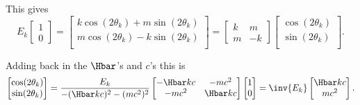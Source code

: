 {This gives
%
\begin{dmath}\label{eqn:qmLecture9Problems:320}
E_k
\begin{bmatrix}
1 \\
0
\end{bmatrix}
=
\begin{bmatrix}
k \cos(2 \theta_k) + m \sin(2 \theta_k) \\
m \cos(2 \theta_k) - k \sin(2 \theta_k) \\
\end{bmatrix}
=
\begin{bmatrix}
k & m \\
m & -k
\end{bmatrix}
\begin{bmatrix}
\cos(2 \theta_k) \\
\sin(2 \theta_k) \\
\end{bmatrix}.
\end{dmath}

Adding back in the \(\Hbar\)'s and \(c\)'s this is
%
\begin{dmath}\label{eqn:qmLecture9Problems:340}
\begin{bmatrix}
\cos(2 \theta_k) \\
\sin(2 \theta_k) \\
\end{bmatrix}
=
\frac{E_k}{-(\Hbar k c)^2 -(m c^2)^2}
\begin{bmatrix}
- \Hbar k c & - m c^2 \\
- m c^2     & \Hbar k c
\end{bmatrix}
\begin{bmatrix}
1 \\
0
\end{bmatrix}
=
\inv{E_k}
\begin{bmatrix}
\Hbar k c \\
m c^2
\end{bmatrix}.
\end{dmath}


}
